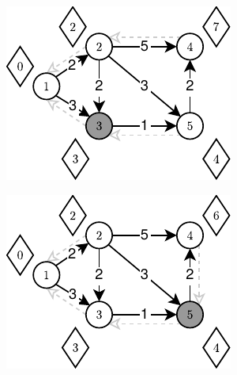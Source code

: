 \begin{figure}[!htbp]
\begin{subfigure}[b]{0.19\textwidth}
		\includegraphics[width=\textwidth]{Chapter_II/TOPOLOGIC-SHORTEST-PATH-Example/c.pdf}
		\caption{}
		\label{fig:exampleTopologicalShotrestPath:c}
	\end{subfigure}
	\hfill
	\begin{subfigure}[b]{0.19\textwidth}
		\includegraphics[width=\textwidth]{Chapter_II/TOPOLOGIC-SHORTEST-PATH-Example/d.pdf}
		\caption{}
		\label{fig:exampleTopologicalShotrestPath:d}
	\end{subfigure}
	\hfill
	\begin{subfigure}[b]{0.19\textwidth}

\end{subfigure}
\end{figure}
